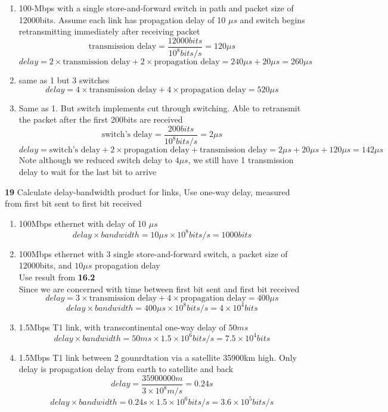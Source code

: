 \documentclass[11pt]{article}
\begin{document}
\begin{enumerate}
    \item 100-Mbps with a single store-and-forward switch in path and packet size of 12000bits. Assume each link has propagation delay of 10 $\mu s$ and switch begins retransmitting immediately after receiving packet\\ 
    \[
        \text{transmission delay} = \frac{12000bits}{10^8 bits/s} = 120 \mu s
    \]
    \[
        delay = 2\times \text{transmission delay} + 2\times \text{propagation delay} = 240\mu s + 20\mu s = 260 \mu s
    \]
    \item same as 1 but 3 switches
    \[
        delay = 4\times \text{transmission delay} + 4\times \text{propagation delay} = 520\mu s
    \]
    \item Same as 1. But switch implements cut through switching. Able to retransmit the packet after the first 200bits are received
    \[
        \text{switch's delay} = \frac{200 bits}{10^8 bits/s} = 2 \mu s
    \]
    \[
        delay = \text{switch's delay} + 2\times \text{propagation delay} + \text{transmission delay} = 2\mu s + 20\mu s + 120 \mu s= 142 \mu s
    \]
    Note although we reduced switch delay to $4\mu s$, we still have 1 transmission delay to wait for the last bit to arrive
\end{enumerate}
\textbf{19} Calculate delay-bandwidth product for links, Use one-way delay, measured from first bit sent to first bit received
\begin{enumerate}
    \item 100Mbps ethernet with delay of 10 $\mu s$
    \[
        delay\times bandwidth = 10\mu s \times 10^8 bits/s = 1000 bits
    \]
    \item 100Mbps ethernet with 3 single store-and-forward switch, a packet size of 12000bits, and $10 \mu s$ propagation delay \\
    Use result from \textbf{16.2}\\
    Since we are concerned with time between first bit sent and first bit received
    \[
        delay = 3\times \text{transmission delay} + 4\times \text{propagation delay} = 400\mu s
    \]
    \[
        delay\times bandwidth = 400\mu s \times 10^8 bits/s = 4\times 10^4 bits
    \]
    \item 1.5Mbps T1 link, with transcontinental one-way delay of $50ms$
    \[
        delay\times bandwidth = 50ms \times 1.5\times 10^6 bits/s = 7.5 \times 10^4 bits
    \]
    \item 1.5Mbps T1 link between 2 gounrdtation via a satellite 35900km high. Only delay is propagation delay from earth to satellite and back 
    \[
        delay = \frac{35900000m}{3\times 10^8 m/s} = 0.24s
    \]
    \[
        delay\times bandwidth = 0.24s \times 1.5\times 10^6 bits/s = 3.6\times 10^5 bits/s
    \]
\end{enumerate}
\end{document}
